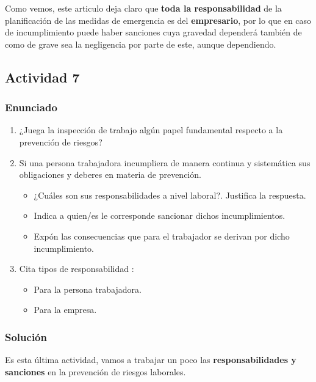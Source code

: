 Como vemos, este articulo deja claro que \textbf{toda la responsabilidad} de la planificación de las medidas de emergencia es del \textbf{empresario}, por lo que en caso de incumplimiento puede haber sanciones cuya gravedad dependerá también de como de grave sea la negligencia por parte de este, aunque dependiendo.

\subsection{Actividad 7}

\subsubsection{Enunciado}
\begin{enumerate}[label=\alph*.]
    \item ¿Juega la inspección de trabajo algún papel fundamental respecto a la prevención de riesgos?
    \item Si una persona trabajadora incumpliera de manera continua y sistemática sus obligaciones y deberes en materia de prevención.
    \begin{itemize}
        \item ¿Cuáles son sus responsabilidades a nivel laboral?. Justifica la respuesta.
        \item Indica a quien/es le corresponde sancionar dichos incumplimientos.
        \item Expón las consecuencias que para el trabajador se derivan por dicho incumplimiento.
    \end{itemize}

    \item Cita tipos de responsabilidad :
    \begin{itemize}
        \item Para la persona trabajadora.
        \item Para la empresa.
    \end{itemize}
\end{enumerate}

\subsubsection{Solución}
Es esta última actividad, vamos a trabajar un poco las \textbf{responsabilidades y sanciones} en la prevención de riesgos laborales.


